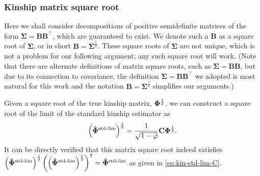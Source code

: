 \documentclass[11pt]{article}
\newcommand{\kinMat}{%
  \ensuremath{%
    \mathbf{\Phi}
  }%
  \xspace%
}%
\newcommand{\kinMatStdLim}{%
  \ensuremath{%
    \mathbf{\hat{\Phi}}^\text{std-lim}
  }%
  \xspace%
}%
\begin{document}

\subsubsection{Kinship matrix square root}


Here we shall consider decompositions of positive semidefinite matrices of the form $\mathbf{\Sigma} = \mathbf{B} \mathbf{B}^\intercal$, which are guaranteed to exist.
We denote such a $\mathbf{B}$ as a square root of $\mathbf{\Sigma}$, or in short $\mathbf{B} = \mathbf{\Sigma}^\frac{1}{2}$.
These square roots of $\mathbf{\Sigma}$ are not unique, which is not a problem for our following argument; any such square root will work.
(Note that there are alternate definitions of matrix square roots, such as $\mathbf{\Sigma} = \mathbf{B} \mathbf{B}$, but due to its connection to covariance, the definition $\mathbf{\Sigma} = \mathbf{B} \mathbf{B}^\intercal$ we adopted is most natural for this work and the notation $\mathbf{B} = \mathbf{\Sigma}^\frac{1}{2}$ simplifies our arguments.)

Given a square root of the true kinship matrix, $\kinMat^\frac{1}{2}$, we can construct a square root of the limit of the standard kinship estimator as
\begin{equation}
  \label{eq:eq:kin-std-lim-C-sqrt}
  \left( \kinMatStdLim \right)^\frac{1}{2}
  =
  \frac{1}{ \sqrt{ 1 - \bar{\varphi} } }
  \mathbf{C} \kinMat^\frac{1}{2}
  .
\end{equation}
It can be directly verified that this matrix square root indeed satisfies
$\left( \kinMatStdLim \right)^\frac{1}{2} \left( \left( \kinMatStdLim \right)^\frac{1}{2} \right)^\intercal = \kinMatStdLim$
as given in \cref{eq:kin-std-lim-C}.
\end{document}
